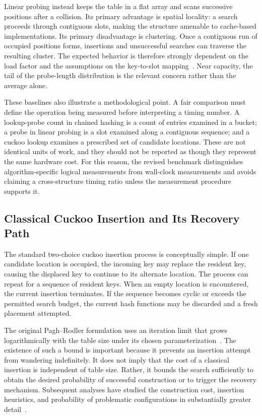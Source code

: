 \documentclass[conference]{IEEEtran}
\begin{document}
Linear probing instead keeps the table in a flat array and scans successive positions after a collision. Its primary advantage is spatial locality: a search proceeds through contiguous slots, making the structure amenable to cache-based implementations. Its primary disadvantage is clustering. Once a contiguous run of occupied positions forms, insertions and unsuccessful searches can traverse the resulting cluster. The expected behavior is therefore strongly dependent on the load factor and the assumptions on the key-to-slot mapping~\cite{knuth1998art}. Near capacity, the tail of the probe-length distribution is the relevant concern rather than the average alone.

These baselines also illustrate a methodological point. A fair comparison must define the operation being measured before interpreting a timing number. A lookup-probe count in chained hashing is a count of entries examined in a bucket; a probe in linear probing is a slot examined along a contiguous sequence; and a cuckoo lookup examines a prescribed set of candidate locations. These are not identical units of work, and they should not be reported as though they represent the same hardware cost. For this reason, the revised benchmark distinguishes algorithm-specific logical measurements from wall-clock measurements and avoids claiming a cross-structure timing ratio unless the measurement procedure supports it.

\subsection{Classical Cuckoo Insertion and Its Recovery Path}

The standard two-choice cuckoo insertion process is conceptually simple. If one candidate location is occupied, the incoming key may replace the resident key, causing the displaced key to continue to its alternate location. The process can repeat for a sequence of resident keys. When an empty location is encountered, the current insertion terminates. If the sequence becomes cyclic or exceeds the permitted search budget, the current hash functions may be discarded and a fresh placement attempted.

The original Pagh--Rodler formulation uses an iteration limit that grows logarithmically with the table size under its chosen parameterization~\cite{pagh2004cuckoo}. The existence of such a bound is important because it prevents an insertion attempt from wandering indefinitely. It does not imply that the cost of a classical insertion is independent of table size. Rather, it bounds the search sufficiently to obtain the desired probability of successful construction or to trigger the recovery mechanism. Subsequent analyses have studied the construction cost, insertion heuristics, and probability of problematic configurations in substantially greater detail~\cite{devroye2003cuckoo,drmota2012precise,fountoulakis2010insertion}.
\end{document}
